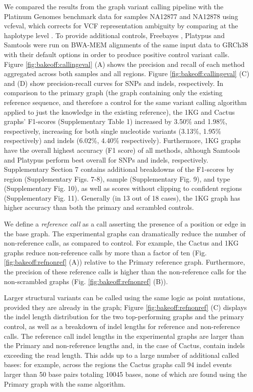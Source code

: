 We compared the results from the graph variant calling pipeline with the
Platinum Genomes benchmark data for samples NA12877 and
NA12878\cite{Eberle2016-zc} using vcfeval, which corrects for VCF
representation ambiguity by comparing at the haplotype level
\cite{Cleary2015-oy} \cite{Zook2014-tl}. To provide additional controls,
Freebayes \cite{garrison2012haplotype}, Platypus \cite{Rimmer2014-zj} and
Samtools \cite{Li2009-je} were run on BWA-MEM \cite{li2009fast}
alignments of the same input data to GRCh38 with their default options
in order to produce positive control variant calls. Figure \ref{fig:bakeoff:callingeval} (A) shows
the precision and recall of each method aggregated across both samples
and all regions. Figure \ref{fig:bakeoff:callingeval} (C) and (D) show precision-recall curves for
SNPs and indels, respectively. In comparison to the primary graph (the
graph containing only the existing reference sequence, and therefore a
control for the same variant calling algorithm applied to just the
knowledge in the existing reference), the 1KG and Cactus graphs'
F1-scores (Supplementary Table 1) increased by 3.50\% and 1.98\%,
respectively, increasing for both single nucleotide variants (3.13\%,
1.95\% respectively) and indels (6.02\%, 4.40\% respectively).
Furthermore, 1KG graphs have the overall highest accuracy (F1 score) of
all methods, although Samtools and Platypus perform best overall for
SNPs and indels, respectively. Supplementary Section 7 contains
additional breakdowns of the F1-scores by region (Supplementary Figs.
7-8), sample (Supplementary Fig. 9), and type (Supplementary Fig. 10),
as well as scores without clipping to confident regions (Supplementary
Fig. 11). Generally (in 13 out of 18 cases), the 1KG graph has higher
accuracy than both the primary and scrambled controls.

We define a \emph{reference} \emph{call} as a call asserting the
presence of a position or edge in the base graph. The experimental
graphs can dramatically reduce the number of non-reference calls, as
compared to control. For example, the Cactus and 1KG graphs reduce
non-reference calls by more than a factor of ten (Fig. \ref{fig:bakeoff:refnonref} (A)) relative
to the Primary reference graph. Furthermore, the precision of these
reference calls is higher than the non-reference calls for the
non-scrambled graphs (Fig. \ref{fig:bakeoff:refnonref} (B)).

Larger structural variants can be called using the same logic as point
mutations, provided they are already in the graph; Figure \ref{fig:bakeoff:refnonref} (C) displays
the indel length distribution for the two top-performing graphs and the
primary control, as well as a breakdown of indel lengths for reference
and non-reference calls. The reference call indel lengths in the
experimental graphs are larger than the Primary and non-reference
lengths and, in the case of Cactus, contain indels exceeding the read
length. This adds up to a large number of additional called bases: for
example, across the regions the Cactus graphs call 94 indel events
larger than 50 base pairs totaling 10045 bases, none of which are found
using the Primary graph with the same algorithm.

